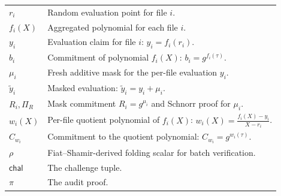 \documentclass[lettersize,journal]{IEEEtran}
\begin{document}
\begin{table}[htbp]
\begin{tabular}{@{} p{} p{} @{}}
$r_i$ & Random evaluation point for file $i$. \\
$f_i(X)$ & Aggregated polynomial for each file $i$. \\
$y_i$ & Evaluation claim for file $i$: $y_i = f_i(r_i)$. \\
$b_i$ & Commitment of polynomial $f_i(X)$: $b_i=g^{f_i(\tau)}$. \\
$\mu_i$ & Fresh additive mask for the per-file evaluation $y_i$. \\
$\tilde{y}_i$ & Masked evaluation: $\tilde{y}_i = y_i + \mu_i$. \\
$R_i,\Pi_R$ & Mask commitment $R_i = g^{\mu_i}$ and Schnorr proof for $\mu_i$. \\
$w_i(X)$ & Per-file quotient polynomial of $f_i(X)$: $w_i(X) = \frac{f_i(X) - y_i}{X - r_i}$. \\
$C_{w_i}$ & Commitment to the quotient polynomial: $C_{w_i}=g^{w_i(\tau)}$. \\
$\rho$ & Fiat--Shamir-derived folding scalar for batch verification. \\
$\mathsf{chal}$ & The challenge tuple. \\
$\pi$ & The audit proof. \\
\hline
\end{tabular}
\end{table}
\end{document}
